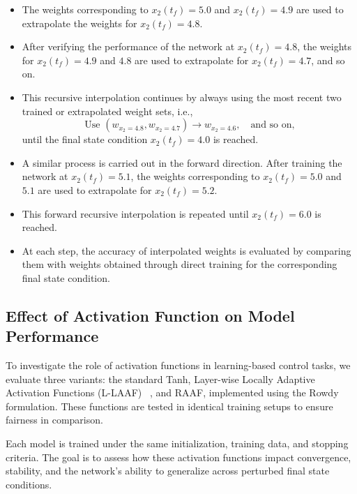 \begin{itemize}
    \item The weights corresponding to \( x_2(t_f) = 5.0 \) and \( x_2(t_f) = 4.9 \) are used to extrapolate the weights for \( x_2(t_f) = 4.8 \).

    \item After verifying the performance of the network at \( x_2(t_f) = 4.8 \), the weights for \( x_2(t_f) = 4.9 \) and \( 4.8 \) are used to extrapolate for \( x_2(t_f) = 4.7 \), and so on.

    \item This recursive interpolation continues by always using the most recent two trained or extrapolated weight sets, i.e.,
    \[
    \text{Use } (w_{x_2 = 4.8}, w_{x_2 = 4.7}) \rightarrow w_{x_2 = 4.6}, \quad \text{and so on,}
    \]
    until the final state condition \( x_2(t_f) = 4.0 \) is reached.
    
    \item A similar process is carried out in the forward direction. After training the network at \( x_2(t_f) = 5.1 \), the weights corresponding to \( x_2(t_f) = 5.0 \) and \( 5.1 \) are used to extrapolate for \( x_2(t_f) = 5.2 \).

    \item This forward recursive interpolation is repeated until \( x_2(t_f) = 6.0 \) is reached.

    \item At each step, the accuracy of interpolated weights is evaluated by comparing them with weights obtained through direct training for the corresponding final state condition.
\end{itemize}


\subsection{Effect of Activation Function on Model Performance}

To investigate the role of activation functions in learning-based control tasks, we evaluate three variants: the standard Tanh, Layer-wise Locally Adaptive Activation Functions (L-LAAF) ~\cite{jagtap2022deep}, and RAAF, implemented using the Rowdy formulation. These functions are tested in identical training setups to ensure fairness in comparison.

Each model is trained under the same initialization, training data, and stopping criteria. The goal is to assess how these activation functions impact convergence, stability, and the network’s ability to generalize across perturbed final state conditions.

